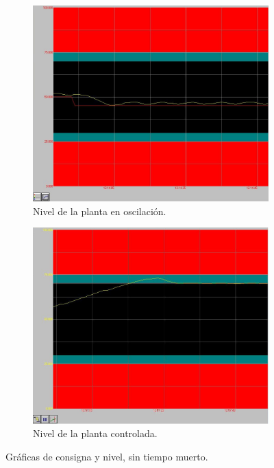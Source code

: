\begin{figure}[ht]
  \centering
  \begin{subfigure}[b]{0.49\textwidth}
    \includegraphics[width=\textwidth]
    {Cap4-ProgramacionPLC/images/oscperm.jpeg}
     \caption{Nivel de la planta en oscilación.}
     \label{fig:oscilacionperm}
  \end{subfigure}%
  \hfill
  \begin{subfigure}[b]{0.49\textwidth}    
      \includegraphics[width=\textwidth]
      {Cap4-ProgramacionPLC/images/controlado.jpeg}
      \caption{Nivel de la planta controlada.}
      \label{fig:controlado}
  \end{subfigure}
  \caption{Gráficas de consigna y nivel, sin tiempo muerto.}
\end{figure}


